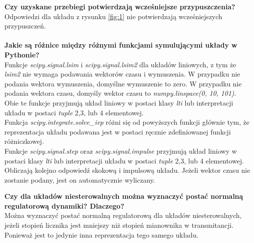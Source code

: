 \documentclass[12pt, letterpaper]{article}
\begin{document}
\begin{enumerate}
            \textbf{Czy uzyskane przebiegi potwierdzają wcześniejsze przypuszczenia?}\\
            Odpowiedzi dla układu z rysunku \ref{fig:1} nie potwierdzają wcześniejszych przypuszczeń.\\\\
            \textbf{Jakie są różnice między różnymi funkcjami symulującymi układy w Pythonie?}\\
            Funkcje \emph{scipy.signal.lsim} i \emph{scipy.signal.lsim2} dla układów liniowych,
            z tym że \emph{lsim2} nie wymaga podawania wektorów czasu i wymuszenia. W przypadku
            nie podania wektora wymuszenia, domyślne wymuszenie to zero. W przypadku nie podania
            wektora czasu, domyśly wektor czasu to \emph{numpy.linspace(0, 10, 101)}. Obie te
            funkcje przyjmują układ liniowy w postaci klasy \emph{lti} lub interpretacji układu
            w postaci \emph{tuple} 2,3, lub 4 elementowej.\\
            Funkcja \emph{scipy.integrate.solve\_ivp} różni się od powyższych funkcji głównie tym,
            że reprezentacja układu podawana jest w postaci ręcznie zdefiniowanej funkcji różniczkowej.\\
            Funkcje \emph{scipy.signal.step} oraz \emph{scipy.signal.impulse} przyjmują układ
            liniowy w postaci klasy \emph{lti} lub interpretacji układu w postaci
            \emph{tuple} 2,3, lub 4 elementowej. Obliczają kolejno odpowiedź skokową i impulsową układu.
            Jeżeli wektor czasu nie zostanie podany, jest on automatycznie wyliczany.
    
            \textbf{Czy dla układów niesterowalnych można wyznaczyć postać normalną regulatorową
            dynamiki? Dlaczego?}\\
            Można wyznaczyć postać normalną regulatorową dla układów niesterowalnych, jeżeli stopień
            licznika jest mniejszy niż stopień mianownika w transmitancji. Ponieważ jest to jedynie
            inna reprezentacja tego samego układu.


\end{enumerate}
\end{document}
